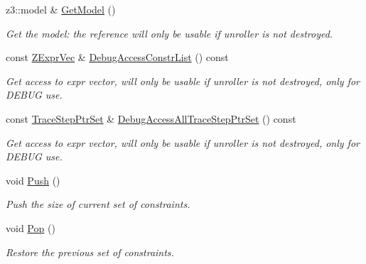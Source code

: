 \begin{DoxyCompactItemize}
\mbox{\label{classilang_1_1_inter_ila_unroller_a7393cee916d7f0227348e7d155c0fd8e}} 
z3\+::model \& \mbox{\hyperlink{classilang_1_1_inter_ila_unroller_a7393cee916d7f0227348e7d155c0fd8e}{Get\+Model}} ()
\begin{DoxyCompactList}\small\item\em Get the model\+: the reference will only be usable if unroller is not destroyed. \end{DoxyCompactList}\item 
\mbox{\label{classilang_1_1_inter_ila_unroller_a904c8501311d1f0ab7c8a57002797dc9}} 
const \mbox{\hyperlink{classilang_1_1_inter_ila_unroller_ae83ebf1fea382fb26be5c53052e86ae4}{Z\+Expr\+Vec}} \& \mbox{\hyperlink{classilang_1_1_inter_ila_unroller_a904c8501311d1f0ab7c8a57002797dc9}{Debug\+Access\+Constr\+List}} () const
\begin{DoxyCompactList}\small\item\em Get access to expr vector, will only be usable if unroller is not destroyed, only for D\+E\+B\+UG use. \end{DoxyCompactList}\item 
\mbox{\label{classilang_1_1_inter_ila_unroller_a156f2962b14bfa373df3c8aaa7957aea}} 
const \mbox{\hyperlink{classilang_1_1_inter_ila_unroller_a78cea73f936eeb438cdf33a8e9ccd9f6}{Trace\+Step\+Ptr\+Set}} \& \mbox{\hyperlink{classilang_1_1_inter_ila_unroller_a156f2962b14bfa373df3c8aaa7957aea}{Debug\+Access\+All\+Trace\+Step\+Ptr\+Set}} () const
\begin{DoxyCompactList}\small\item\em Get access to expr vector, will only be usable if unroller is not destroyed, only for D\+E\+B\+UG use. \end{DoxyCompactList}\item 
\mbox{\label{classilang_1_1_inter_ila_unroller_aa29b2b4958a7fc8ab39dc48913435add}} 
void \mbox{\hyperlink{classilang_1_1_inter_ila_unroller_aa29b2b4958a7fc8ab39dc48913435add}{Push}} ()
\begin{DoxyCompactList}\small\item\em Push the size of current set of constraints. \end{DoxyCompactList}\item 
\mbox{\label{classilang_1_1_inter_ila_unroller_a922a75c80f16820692b720e6151885eb}} 
void \mbox{\hyperlink{classilang_1_1_inter_ila_unroller_a922a75c80f16820692b720e6151885eb}{Pop}} ()
\begin{DoxyCompactList}\small\item\em Restore the previous set of constraints. \end{DoxyCompactList}\end{DoxyCompactItemize}
